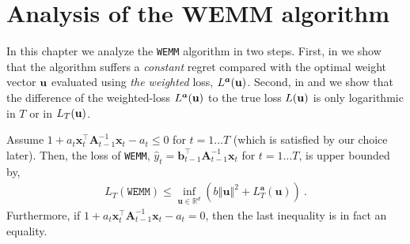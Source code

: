 \chapter{Analysis of the WEMM algorithm}
\label{chap:WEMM_analysis}

In this chapter we analyze the \texttt{WEMM} algorithm in two steps. First, in
 we show that the algorithm suffers a {\em
  constant} regret
compared with the optimal
weight vector $\mathbf{u}$ evaluated using {\em the weighted} loss,
$L^{\boldsymbol{a}}(\mathbf{u})$. Second, in  and  we
show that the difference of the weighted-loss $L^{\boldsymbol{a}}(\mathbf{u})$ to the true loss
$L(\mathbf{u})$ is only logarithmic in $T$ or in $L_T(\mathbf{u})$.
\begin{theorem}
\label{thm:theorem2}
Assume $1+a_{t}\mathbf{x}_{t}^{\top}\mathbf{A}_{t-1}^{-1}\mathbf{x}_{t}-a_{t}\leq0$
for $t = 1 \dots T$ (which is satisfied by our choice later). Then,
the loss of \texttt{WEMM},
$\hat{y}_{t}=\mathbf{b}_{t-1}^{\top}\mathbf{A}_{t-1}^{-1}\mathbf{x}_{t}$ for $t=1 \dots T$, is upper bounded by,
\begin{align*}
L_{T}(\texttt{WEMM})\leq\inf_{\mathbf{u}\in\mathbb{R}^{d}}\left(b\left\Vert
    \mathbf{u}\right\Vert
  ^{2}+L_{T}^{\boldsymbol{a}}(\mathbf{u})\right) ~.
\end{align*}
Furthermore, if
$1+a_{t}\mathbf{x}_{t}^{\top}\mathbf{A}_{t-1}^{-1}\mathbf{x}_{t}-a_{t}
= 0$, then the last inequality is in fact an equality.
\end{theorem}

